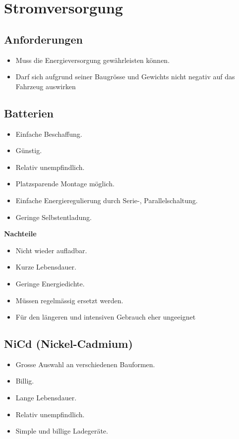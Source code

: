 \section{Stromversorgung}

\subsection {Anforderungen}
\begin{itemize}
\item Muss die Energieversorgung gewährleisten können.
\item Darf sich aufgrund seiner Baugrösse und Gewichts nicht negativ auf das Fahrzeug auswirken
\end{itemize}

\subsection {Batterien}

\begin{itemize}
\item Einfache Beschaffung.
\item Günstig.
\item Relativ unempfindlich.
\item Platzsparende Montage möglich.
\item Einfache Energieregulierung durch Serie-, Parallelschaltung.
\item Geringe Selbstentladung.
\end{itemize}

\textbf {Nachteile}
\begin{itemize}
\item Nicht wieder aufladbar. 
\item Kurze Lebensdauer.	
\item Geringe Energiedichte.
\item Müssen regelmässig ersetzt werden.
\item Für den längeren und intensiven Gebrauch eher ungeeignet
\end{itemize}

\subsection {NiCd (Nickel-Cadmium)}

\begin{itemize}
\item Grosse Auswahl an verschiedenen Bauformen.
\item Billig.
\item Lange Lebensdauer.
\item Relativ unempfindlich.
\item Simple und billige Ladegeräte.
\end{itemize}

